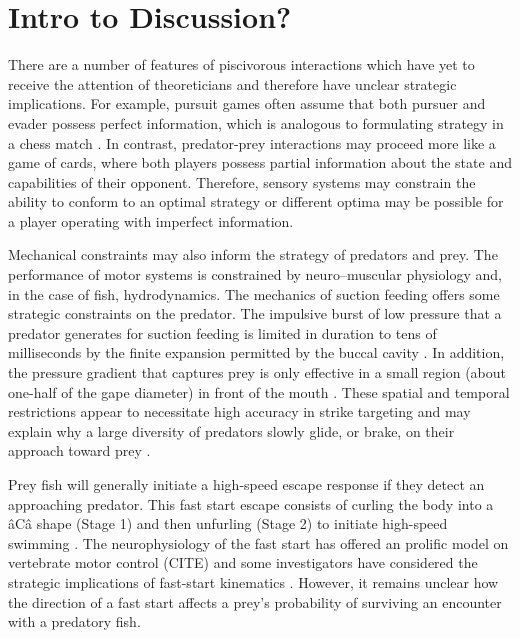 
\section{Intro to Discussion?}


There are a number of features of piscivorous interactions which have yet to receive the attention of theoreticians and therefore have unclear strategic implications. For example, pursuit games often assume that both pursuer and evader possess perfect information, which is analogous to formulating strategy in a chess match \citep{Salen:2004wp}. In contrast, predator-prey interactions may proceed more like a game of cards, where both players possess partial information about the state and capabilities of their opponent. Therefore, sensory systems may constrain the ability to conform to an optimal strategy or different optima may be possible for a player operating with imperfect information. 

Mechanical constraints may also inform the strategy of predators and prey. The performance of motor systems is constrained by neuro--muscular physiology and, in the case of fish, hydrodynamics. The mechanics of suction feeding offers some strategic constraints on the predator. The impulsive burst of low pressure that a predator generates for suction feeding is limited in duration to tens of milliseconds  by the finite expansion permitted by the buccal cavity \citep{Wainwright:2001ufa}. In addition, the pressure gradient that captures prey is only effective in a small region (about one-half of the gape diameter) in front of the mouth \citep{Day:2005p5856}. These spatial and temporal restrictions appear to necessitate high accuracy in strike targeting and may explain why a large diversity of predators slowly glide, or brake, on their approach toward prey \citep{Higham:2005iu, Higham:2007go}. 


Prey fish will generally initiate a high-speed escape response if they detect an approaching predator. This fast start escape consists of curling the body into a âCâ shape (Stage 1) and then unfurling (Stage 2) to initiate high-speed swimming \citep{D:1973up}. The neurophysiology of the fast start has offered an prolific model on vertebrate motor control (CITE) and some investigators have considered the strategic implications of fast-start kinematics \citep[reviewed by][]{Domenici:2011tv, Domenici:2011vl}. However, it remains unclear how the direction of a fast start affects a prey's probability of surviving an encounter with a predatory fish. 




